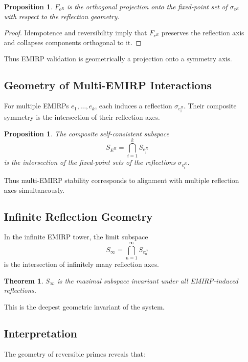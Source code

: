 \documentclass[11pt]{article}
\theoremstyle{definition}
\theoremstyle{plain}
\newtheorem{theorem}[definition]{Theorem}
\newtheorem{proposition}[definition]{Proposition}
\theoremstyle{remark}
\begin{document}
\begin{proposition}
$F_{e^R}$ is the orthogonal projection onto the fixed-point set of
$\sigma_{e^R}$ with respect to the reflection geometry.
\end{proposition}

\begin{proof}
Idempotence and reversibility imply that $F_{e^R}$ preserves the
reflection axis and collapses components orthogonal to it.
\end{proof}

Thus EMIRP validation is geometrically a projection onto a symmetry axis.

\subsection{Geometry of Multi-EMIRP Interactions}

For multiple EMIRPs $e_1,\dots,e_k$, each induces a reflection
$\sigma_{e_i^R}$. Their composite symmetry is the intersection of their
reflection axes.

\begin{proposition}
The composite self-consistent subspace
\[
S_{E^R} = \bigcap_{i=1}^k S_{e_i^R}
\]
is the intersection of the fixed-point sets of the reflections
$\sigma_{e_i^R}$.
\end{proposition}

Thus multi-EMIRP stability corresponds to alignment with multiple
reflection axes simultaneously.

\subsection{Infinite Reflection Geometry}

In the infinite EMIRP tower, the limit subspace
\[
S_\infty = \bigcap_{n=1}^\infty S_{e_n^R}
\]
is the intersection of infinitely many reflection axes.

\begin{theorem}
$S_\infty$ is the maximal subspace invariant under all EMIRP-induced
reflections.
\end{theorem}

This is the deepest geometric invariant of the system.

\subsection{Interpretation}

The geometry of reversible primes reveals that:
\end{document}
